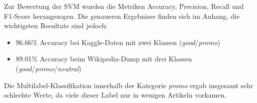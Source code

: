 Zur Bewertung der SVM wurden die Metriken Accuracy, Precision, Recall und F1-Score herangezogen. Die genaueren Ergebnisse finden sich im Anhang, die wichtigsten Resultate sind jedoch:

\begin{itemize}
    \item 96.66\% Accuracy bei Kaggle-Daten mit zwei Klassen (\textit{good}/\textit{promo})
    \item 89.01\% Accuracy beim Wikipedia-Dump mit drei Klassen (\textit{good}/\textit{promo}/\textit{neutral})
\end{itemize}

Die Multilabel-Klassifikation innerhalb der Kategorie \textit{promo} ergab insgesamt sehr schlechte Werte, da viele dieser Label nur in wenigen Artikeln vorkamen.
